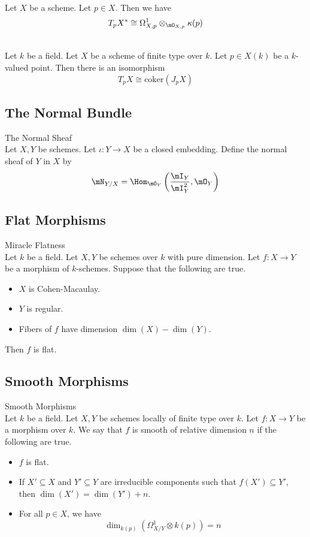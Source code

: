 \documentclass[a4paper]{article}
\begin{document}
\begin{crl}{}{}\\
Let $X$ be a scheme. Let $p\in X$. Then we have $$T_pX^\ast\cong\Omega_{X,p}^1\otimes_{\mO_{X,p}}\kappa(p)$$
\end{crl}

\begin{prp}{}{}\\
Let $k$ be a field. Let $X$ be a scheme of finite type over $k$. Let $p\in X(k)$ be a $k$-valued point. Then there is an isomorphism $$T_pX\cong\text{coker}(J_pX)$$
\end{prp}

\subsection{The Normal Bundle}
\begin{defn}{The Normal Sheaf}{}\\
Let $X,Y$ be schemes. Let $\iota:Y\to X$ be a closed embedding. Define the normal sheaf of $Y$ in $X$ by $$\mN_{Y/X}=\Hom_{\mO_Y}\left(\frac{\mI_Y}{\mI_Y^2},\mO_Y\right)$$
\end{defn}

\subsection{Flat Morphisms}
\begin{thm}{Miracle Flatness}{}\\
Let $k$ be a field. Let $X,Y$ be schemes over $k$ with pure dimension. Let $f:X\to Y$ be a morphism of $k$-schemes. Suppose that the following are true. 
\begin{itemize}
\item $X$ is Cohen-Macaulay. 
\item $Y$ is regular. 
\item Fibers of $f$ have dimension $\dim(X)-\dim(Y)$. 
\end{itemize}
Then $f$ is flat. 
\end{thm}

\subsection{Smooth Morphisms}
\begin{defn}{Smooth Morphisms}{}\\
Let $k$ be a field. Let $X,Y$ be schemes locally of finite type over $k$. Let $f:X\to Y$ be a morphism over $k$. We say that $f$ is smooth of relative dimension $n$ if the following are true. 
\begin{itemize}
\item $f$ is flat. 
\item If $X'\subseteq X$ and $Y'\subseteq Y$ are irreducible components such that $f(X')\subseteq Y'$, then $\dim(X')=\dim(Y')+n$. 
\item For all $p\in X$, we have $$\dim_{k(p)}(\Omega_{X/Y}^1\otimes k(p))=n$$
\end{itemize}
\end{defn}
\end{document}
